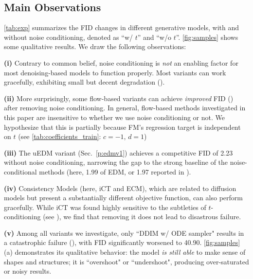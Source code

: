 \subsection{Main Observations}


\cref{tab:exp} summarizes the FID changes in different generative models, with and without noise conditioning, denoted as ``w/ $t$'' and ``w/o $t$''.
\cref{fig:samples} shows some qualitative results.
We draw the following observations:


    \textbf{(i)} Contrary to common belief, noise conditioning is \textit{not} an enabling factor for most denoising-based models to function properly. Most variants can work gracefully, exhibiting small but decent degradation ({}). 
    
    \textbf{(ii)} More surprisingly, some flow-based variants can achieve \textit{improved} FID ({}) after removing noise conditioning. 
In general, flow-based methods investigated in this paper are insensitive to whether we use noise conditioning or not.
We hypothesize that this is partially because FM's regression target is independent on $t$ (see \cref{tab:coefficients_train}: $c=-1$, $d=1$)

    \textbf{(iii)} The uEDM variant (Sec.~\ref{p:edmv1}) achieves a competitive FID of 2.23 without noise conditioning, narrowing the gap to the strong baseline of the noise-conditional methods (here, 1.99 of EDM, or 1.97 reported in \citet{karras2022edm}).

    \textbf{(iv)} Consistency Models (here, iCT and ECM), which are related to diffusion models but present a substantially different objective function, can also perform gracefully. While iCT was found highly sensitive to the subtleties of $t$-conditioning (see \citet{song2024improved}), we find that removing it does not lead to disastrous failure.
    
    \textbf{(v)} Among all variants we investigate, only ``DDIM w/ ODE sampler" results in a catastrophic failure ({}), with FID significantly worsened to 40.90. \cref{fig:samples} (a) demonstrates its qualitative behavior: the model \textit{is still able} to make sense of shapes and structures; it is ``overshoot" or ``undershoot", producing over-saturated or noisy results.
     
